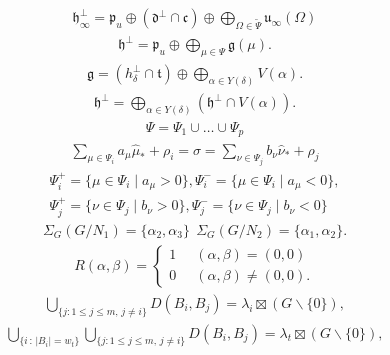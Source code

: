 \begin{align*} \mathfrak h_\infty^\perp = \mathfrak p_u \oplus (\mathfrak d^\perp \cap \mathfrak c) \oplus \bigoplus\limits_{\Omega \in \widetilde \Psi} \mathfrak u_\infty(\Omega)\end{align*}
\begin{align*} \mathfrak h^\perp = \mathfrak p_u \oplus \bigoplus \limits_{\mu \in \Psi} \mathfrak g(\mu).\end{align*}
\begin{align*} \mathfrak g = (h_\delta^\perp \cap \mathfrak t) \oplus \bigoplus \limits_{\alpha \in Y(\delta)} V(\alpha).\end{align*}
\begin{align*} \mathfrak h^\perp = \bigoplus \limits_{\alpha \in Y(\delta)} (\mathfrak h^\perp \cap V(\alpha)).\end{align*}
\begin{align*} \Psi = \Psi_1 \cup \ldots \cup \Psi_p\end{align*}
\begin{align*} \sum \limits_{\mu \in \Psi_i} a_\mu \widehat \mu_* + \rho_i = \sigma = \sum \limits_{\nu \in \Psi_j} b_\nu \widehat \nu_* + \rho_j\end{align*}
\begin{gather*}\Psi_i^+ = \lbrace \mu \in \Psi_i \mid a_\mu > 0 \rbrace, \Psi_i^- = \lbrace \mu \in \Psi_i \mid a_\mu < 0 \rbrace, \\\Psi_j^+ = \lbrace \nu \in \Psi_j \mid b_\nu > 0 \rbrace, \Psi_j^- = \lbrace \nu \in \Psi_j \mid b_\nu < 0 \rbrace\end{gather*}
\begin{align*} \Sigma_G(G/N_1) = \lbrace \alpha_2, \alpha_3 \rbrace \ \ \Sigma_G(G/N_2) = \lbrace \alpha_1, \alpha_2 \rbrace.\end{align*}
\begin{align*}R(\alpha, \beta) = \begin{cases}1 & \;\; (\alpha, \beta)=(0,0)\\0 & \;\; (\alpha, \beta)\neq (0,0). \end{cases}\end{align*}
\begin{align*}\bigcup_{\{j:1\leq j\leq m,\,j\ne i\}}D(B_i,B_j)=\lambda_i \boxtimes (G\backslash \{0\}),\end{align*}
\begin{align*}\bigcup_{\{i\,:\,|B_i|=w_t\}}\bigcup_{\{j:1\leq j\leq m,\,j\ne i\}}D(B_i,B_j)=\lambda_t \boxtimes (G\backslash \{0\}),\end{align*}
